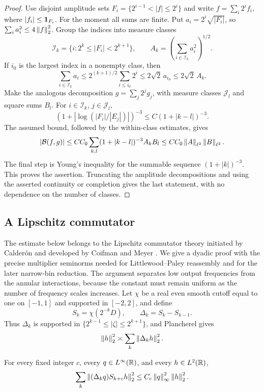 \begin{proof}
Use disjoint amplitude sets
\(F_i=\{2^{i-1}<|f|\le2^i\}\) and write
\(f=\sum_i2^i f_i\), where \(|f_i|\le\mathbf 1_{F_i}\).
For the moment all sums are finite. Put
\(a_i=2^i\sqrt{|F_i|}\), so
\(\sum_i a_i^2\le4\left\|f\right\|_2^2\).
Group the indices into measure classes
\[
 \mathcal I_k=\{i:2^k\le|F_i|<2^{k+1}\},\qquad
 A_k=\left(\sum_{i\in\mathcal I_k}a_i^2\right)^{1/2}.
\]
If \(i_0\) is the largest index in a nonempty class, then
\[
 \sum_{i\in\mathcal I_k}a_i
 \le 2^{(k+1)/2}\sum_{i\le i_0}2^i
 \le 2\sqrt2\,a_{i_0}\le2\sqrt2\,A_k.
\]
Make the analogous decomposition \(g=\sum_j2^j g_j\), with
measure classes \(\mathcal J_l\) and square sums \(B_l\).
For \(i\in\mathcal I_k\), \(j\in\mathcal J_l\),
\[
 (1+|\log(|F_i|/|E_j|)|)^{-3}
       \le C(1+|k-l|)^{-3}.
\]
The assumed bound, followed by the within-class estimates, gives
\[
 \left|\mathcal B(f,g)\right|
   \le C C_0\sum_{k,l}(1+|k-l|)^{-3}A_kB_l
   \le C C_0\left\|A\right\|_{\ell^2}\left\|B\right\|_{\ell^2}.
\]
The final step is Young's inequality for the summable sequence
\((1+|k|)^{-3}\). This proves the assertion. Truncating the amplitude
decompositions and using the asserted continuity or completion gives
the last statement, with no dependence on the number of classes.
\end{proof}

\subsection{A Lipschitz commutator}

The estimate below belongs to the Lipschitz commutator theory initiated
by Calder\'on and developed by Coifman and Meyer
\cite{Calderon1965,CoifmanMeyer1978}. We give a dyadic proof with the
precise multiplier seminorms needed for Littlewood--Paley reassembly
and for the later narrow-bin reduction. The argument separates low
output frequencies from the annular interactions, because the constant
must remain uniform as the number of frequency scales increases.
Let \(\chi\) be a real even smooth cutoff equal to one on
\([-1,1]\) and supported in \([-2,2]\), and define
\[
 S_k=\chi(2^{-k}D),\qquad \Delta_k=S_k-S_{k-1}.
\]
Thus \(\Delta_k\) is supported in
\(\{2^{k-1}\le|\zeta|\le2^{k+1}\}\), and Plancherel gives
\begin{equation}\label{red:lp-square}
 \left\|h\right\|_2^2\asymp\sum_k\left\|\Delta_kh\right\|_2^2.
\end{equation}

\begin{lemma}\label{red:carleson}
For every fixed integer \(c\), every \(q\in L^\infty(\mathbb R)\), and
every \(h\in L^2(\mathbb R)\),
\begin{equation}\label{red:carleson-estimate}
 \sum_k\left\|(\Delta_kq)S_{k+c}h\right\|_2^2
      \le C_c\left\|q\right\|_\infty^2\left\|h\right\|_2^2.
\end{equation}
\end{lemma}


